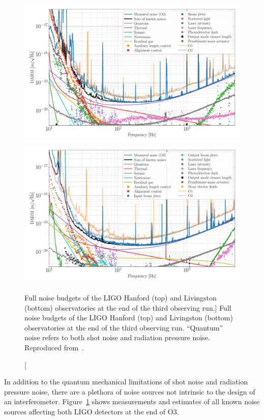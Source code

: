 \begin{figure}
  \centering
  \includegraphics[width=\textwidth]{figures/detectors/budget-lho.pdf}
  \includegraphics[width=\textwidth]{figures/detectors/budget-llo.pdf}
  \caption
  [Full noise budgets of the LIGO Hanford (top) and Livingston (bottom) observatories at the end of the third observing run.]
  {Full noise budgets of the LIGO Hanford (top) and Livingston (bottom) observatories at the end of the third observing run. ``Quantum'' noise refers to both shot noise and radiation pressure noise. Reproduced from~\protect\citet{Buikema_2020}.}
  \label{fig:detectors-budget}
\end{figure}

In addition to the quantum mechanical limitations of shot noise and radiation pressure noise, there are a plethora of noise sources not intrinsic to the design of an interferometer.
Figure~\ref{fig:detectors-budget} shows measurements and estimates of all known noise sources affecting both LIGO detectors at the end of \ac{O3}.

